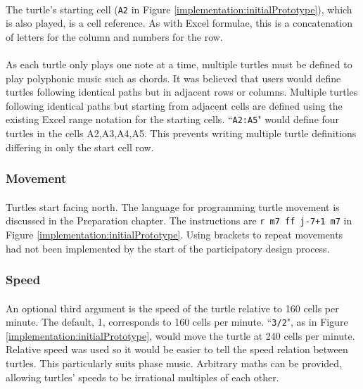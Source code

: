 \paragraph{} The turtle's starting cell (\texttt{A2} in Figure \ref{implementation:initialPrototype}), which is also played, is a cell reference. As with Excel formulae, this is a concatenation of letters for the column and numbers for the row.

\paragraph{} As each turtle only plays one note at a time, multiple turtles must be defined to play polyphonic music such as chords. It was believed that users would define turtles following identical paths but in adjacent rows or columns. Multiple turtles following identical paths but starting from adjacent cells are defined using the existing Excel range notation for the starting cells. ``\texttt{A2:A5}" would define four turtles in the cells A2,A3,A4,A5. This prevents writing multiple turtle definitions differing in only the start cell row.

\vspace{-5pt}
\subsubsection{Movement}

\paragraph{} Turtles start facing north. The language for programming turtle movement is discussed in the Preparation chapter. The instructions are \texttt{r m7 ff j-7+1 m7} in Figure \ref{implementation:initialPrototype}. Using brackets to repeat movements had not been implemented by the start of the participatory design process.

\vspace{-5pt}
\subsubsection{Speed}

\paragraph{} An optional third argument is the speed of the turtle relative to 160 cells per minute. The default, 1, corresponds to 160 cells per minute. ``\texttt{3/2}", as in Figure \ref{implementation:initialPrototype}, would move the turtle at 240 cells per minute. Relative speed was used so it would be easier to tell the speed relation between turtles. This particularly suits phase music. Arbitrary maths can be provided, allowing turtles' speeds to be irrational multiples of each other.

